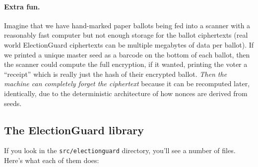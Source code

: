 \documentclass[letterpaper,12pt]{article}
\begin{document}
\paragraph{Extra fun.} Imagine that we have hand-marked paper ballots
being fed into a scanner with a reasonably fast computer but not
enough storage for the ballot ciphertexts (real world ElectionGuard
ciphertexts can be multiple megabytes of data per ballot). If we
printed a unique master seed as a barcode on the bottom of each
ballot, then the scanner could compute the full encryption, if it
wanted, printing the voter a ``receipt'' which is really just the hash
of their encrypted ballot. {\em Then the machine can completely forget
the ciphertext} because it can be recomputed later, identically, due to the
deterministic architecture of how nonces are derived from seeds.

\subsection{The ElectionGuard library}
If you look in the {\tt src/electionguard} directory, you'll see a
number of files. Here's what each of them does:
\end{document}
